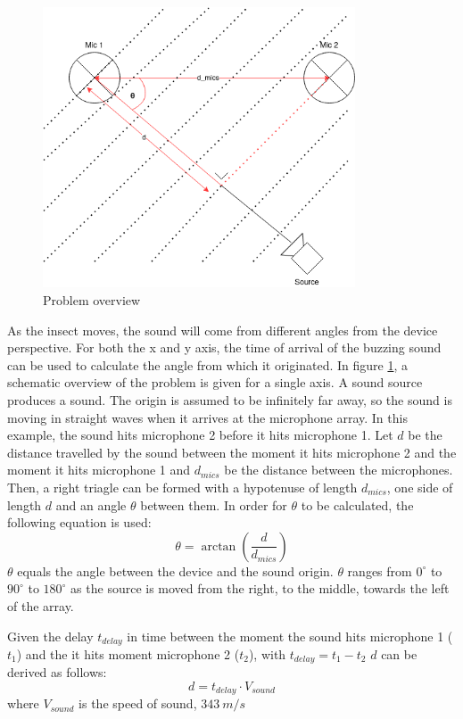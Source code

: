 \documentclass[a4paper]{article}
\begin{document}
\begin{figure}[H]
    \begin{center}
        \includegraphics[width=25em]{assets/problem_overview.png}
        \caption{Problem overview}
        \label{fig:problem_overview}
    \end{center}
\end{figure}

As the insect moves, the sound will come from different angles from the device perspective. For both the x and y axis, the time of arrival of the buzzing sound can be used to calculate the angle from which it originated. In figure \ref{fig:problem_overview}, a schematic overview of the problem is given for a single axis. A sound source produces a sound. The origin is assumed to be infinitely far away, so the sound is moving in straight waves when it arrives at the microphone array. In this example, the sound hits microphone 2 before it hits microphone 1. Let $d$ be the distance travelled by the sound between the moment it hits microphone 2 and the moment it hits microphone 1 and $d_{mics}$ be the distance between the microphones. Then, a right triagle can be formed with a hypotenuse of length $d_{mics}$, one side of length $d$ and an angle $\theta$ between them. In order for $\theta$ to be calculated, the following equation is used:\[\theta = \arctan(\frac{d}{d_{mics}})\] $\theta$ equals the angle between the device and the sound origin. $\theta$ ranges from $0^{\circ}$ to $90^{\circ}$ to $180^{\circ}$ as the source is moved from the right, to the middle, towards the left of the array.

Given the delay $t_{delay}$ in time between the moment the sound hits microphone 1 ($t_1$) and the it hits moment microphone 2 ($t_2$), with $t_{delay} = t_1 - t_2$ $d$ can be derived as follows:\[d = t_{delay} \cdot V_{sound}\]where $V_{sound}$ is the speed of sound, $343\ m/s$
\end{document}
